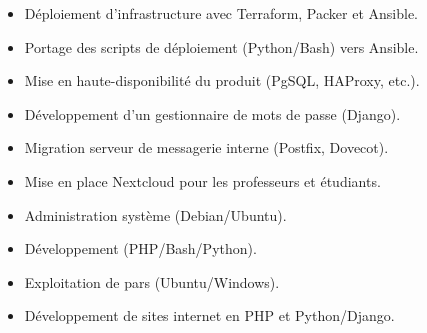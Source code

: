 \documentclass[10pt,a4paper,ragged2e,withhyper]{altacv}
\begin{document}
\begin{paracol}{2}


\divider

\begin{itemize}
    \item Déploiement d'infrastructure avec Terraform, Packer et Ansible.
    \item Portage des scripts de déploiement (Python/Bash) vers Ansible.
    \item Mise en haute-disponibilité du produit (PgSQL, HAProxy, etc.).
\end{itemize}

\divider

\begin{itemize}
    \item Développement d'un gestionnaire de mots de passe (Django).
    \item Migration serveur de messagerie interne (Postfix, Dovecot).
    \item Mise en place Nextcloud pour les professeurs et étudiants.
\end{itemize}

\divider

\begin{itemize}
    \item Administration système (Debian/Ubuntu).
    \item Développement (PHP/Bash/Python).
    \item Exploitation de pars (Ubuntu/Windows).
\end{itemize}

\divider

\begin{itemize}
    \item Développement de sites internet en PHP et Python/Django.
\end{itemize}


\end{paracol}
\end{document}
